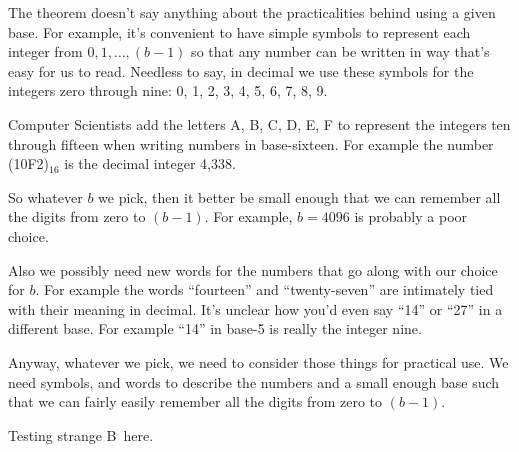 \documentclass{article}
\newcommand{\otherbeta}{{\letterbeta B}}
\begin{document}
The theorem doesn't say anything about the practicalities behind
using a given base. For example, it's convenient to have 
simple symbols to represent each integer from \(0, 1, \dots{}, (b-1)\) so
that any number can be written in way that's easy for us to read. Needless to say,
in decimal we use these symbols for the integers zero through nine: 0, 1, 2, 3, 4, 5, 6, 7, 8, 9.

Computer Scientists add the letters A, B, C, D, E, F to represent the integers ten through fifteen
when writing numbers in base-sixteen. For example the number (10F2)\(_{16}\) is the decimal integer
4,338.

So whatever \(b\) we pick, then it better be small enough that we can remember all the digits
from zero to \((b-1)\). For example, \(b = 4096\) is probably a poor choice.

Also we possibly need new words for the numbers that go along with our choice for \(b\).
For example the words ``fourteen'' and ``twenty-seven'' are intimately tied with their meaning in decimal.
It's unclear how you'd even say ``14'' or ``27'' in a different base. For example ``14'' in base-5 is really the
integer nine.

Anyway, whatever we pick, we need to consider those things for practical use. We need symbols, and words to
describe the numbers and a small enough base such that we can fairly easily remember all the digits 
from zero to \((b-1)\).

Testing strange \otherbeta\ here.
\end{document}
